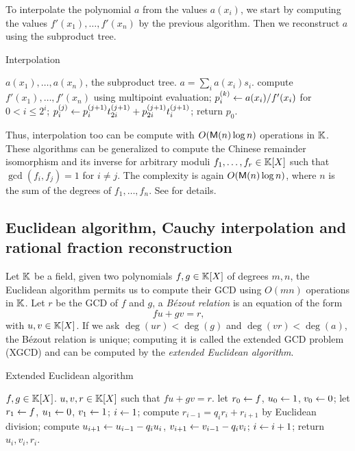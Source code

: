 To interpolate the polynomial $a$ from the values $a(x_i)$, we start
by computing the values $f'(x_1),\ldots,f'(x_n)$ by the previous
algorithm. Then we reconstruct $a$ using the subproduct tree.

\begin{algorithm}
  \caption{\label{alg:interp}Interpolation}
  \begin{algorithmic}[1]
    \REQUIRE $a(x_1),\ldots,a(x_n)$, the subproduct tree.
    \ENSURE $a=\sum_i a(x_i)s_i$.
    \STATE compute $f'(x_1),\ldots,f'(x_n)$ using multipoint evaluation;
    \STATE $p_i^{(k)}\leftarrow a(x_i)/f'(x_i)$ for $0<i\le2^i$;
    \STATE $p_i^{(j)} \leftarrow p_i^{(j+1)}t_{2i}^{(j+1)} + p_{2i}^{(j+1)}t_{i}^{(j+1)}$;
    \ENDFOR
    \ENDFOR
    \STATE return $p_0$.
  \end{algorithmic}
\end{algorithm}

Thus, interpolation too can be compute with $O(\mathsf{M}(n)\log n)$
operations in $\mathbb{K}$. These algorithms can be generalized to compute the
Chinese remainder isomorphism and its inverse for arbitrary moduli
$f_1,\ldots,f_r\in\mathbb{K}[X]$ such that $\gcd(f_i,f_j)=1$ for $i\ne j$. The
complexity is again $O(\mathsf{M}(n)\log n)$, where $n$ is the sum of the
degrees of $f_1,\ldots,f_n$. See \cite[$\S10$]{vzGG} for details.



\subsection[XGCD, Cauchy interpolation and RFR]{Euclidean algorithm,
  Cauchy interpolation and rational fraction reconstruction}
\label{sec:eucl-algor-rati}
Let $\mathbb{K}$ be a field, given two polynomials $f,g\in\mathbb{K}[X]$ of degrees
$m,n$, the Euclidean algorithm permits us to
compute their GCD using $O(mn)$ operations in $\mathbb{K}$. Let $r$
be the GCD of $f$ and $g$, a \textit{Bézout
  relation} is an equation of the form
\begin{equation}
  \label{eq:154}
  fu + gv = r
  \text{,}
\end{equation}
with $u,v\in\mathbb{K}[X]$. If we ask $\deg(ur)<\deg(g)$ and
$\deg(vr)<\deg(a)$, the Bézout relation is unique; computing it is
called the extended GCD problem (XGCD) and can be computed
by the \textit{extended Euclidean
  algorithm}.

\begin{algorithm}
  \caption{Extended Euclidean algorithm}
  \begin{algorithmic}[1]
    \REQUIRE $f,g\in\mathbb{K}[X]$.
    \ENSURE $u,v,r\in\mathbb{K}[X]$ such that $fu+gv=r$.
    \STATE let $r_0\leftarrow f$, $u_0\leftarrow1$, $v_0\leftarrow0$;
    \STATE let $r_1\leftarrow f$, $u_1\leftarrow0$, $v_1\leftarrow1$;
    \STATE $i\leftarrow1$;
    \STATE compute $r_{i-1} = q_ir_i + r_{i+1}$ by Euclidean division;
    \STATE compute $u_{i+1} \leftarrow u_{i-1} - q_iu_i$, $v_{i+1} \leftarrow v_{i-1} - q_iv_i$;
    \STATE $i\leftarrow i+1$;
    \ENDWHILE
    \STATE return $u_i,v_i,r_i$.
  \end{algorithmic}
\end{algorithm}

